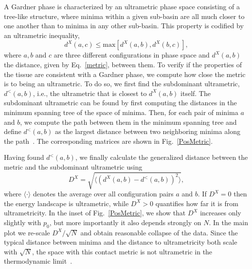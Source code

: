 \documentclass[reprint,amsmath,amssymb,aps]{revtex4-2}
\begin{document}
A Gardner phase is characterized by an ultrametric phase space consisting of a tree-like structure, where minima within a given sub-basin are all much closer to one another than to minima in any other sub-basin. This property is codified by an ultrametric inequality,
\begin{equation}
\label{ultraIneq}
d^X(a,c)\leq \text{max}[d^X(a,b) , d^X(b,c)] ,
\end{equation}
where $a, b$ and $c$ are three different configurations in phase space and $d^X(a,b)$ the distance, given by Eq.~\eqref{metric}, between them. To verify if the properties of the tissue are consistent with a Gardner phase, we compute how close the metric is to being an ultrametric. To do so, we first find the subdominant ultrametric, $d^<(a,b)$, i.e., the ultrametric that is closest to $d^X(a,b)$ itself. The subdominant ultrametric can be found by first computing the distances in the minimum spanning tree of the space of minima. Then, for each pair of minima $a$ and $b$, we compute the path between them in the minimum spanning tree and define $d^<(a,b)$ as the largest distance between two neighboring minima along the path~\citep{Rammal1985}. The corresponding matrices are shown in Fig.~\ref{PosMetric}.

Having found $d^<(a,b)$, we finally calculate the generalized distance between the metric and the subdominant ultrametric using
\begin{equation}\label{genDist}
	D^X=\sqrt{\langle (d^X(a,b)-d^<(a,b))^2 \rangle},
\end{equation}
where $\langle \cdot \rangle$ denotes the average over all configuration pairs $a$ and $b$. If $D^X=0$ then the energy landscape is ultrametric, while $D^X>0$ quantifies how far it is from ultrametricity. In the inset of Fig.~\ref{PosMetric}, we show that $D^X$ increases only slightly with $p_0$, but more importantly it also depends strongly on  $N$. In the main plot we re-scale $D^X/\sqrt{N}$ and obtain reasonable collapse of the data. Since the typical distance between minima and the distance to ultrametricity both scale with $\sqrt{N}$, the space with this contact metric is not ultrametric in the thermodynamic limit~\cite{Dennis2020}.
\end{document}
